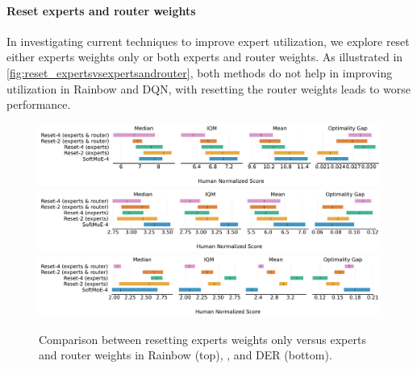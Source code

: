 \paragraph{Reset experts and router weights} In investigating current techniques to improve expert utilization, we explore reset either experts weights only or both experts and router weights. As illustrated in \autoref{fig:reset_expertsvsexpertsandrouter}, both methods do not help in improving utilization in Rainbow and DQN, with resetting the router weights leads to worse performance.

\begin{figure}[h!]
    \centering
    \includegraphics[width=\textwidth]{figures/results/SoftMoE-4_Rainbow-Reset-expertsVSexpertsandrouter_IntEstimates.pdf}
            \includegraphics[width=\textwidth]{figures/results/SoftMoE-4_DQN_Reset_weights_only_vs_weightandrouter_IntEstimates.pdf}
        \includegraphics[width=\textwidth]{figures/results/SoftMoE-4_DER-Reset-expertsVSexpertsandrouter_IntEstimates.pdf}
    \caption{Comparison between resetting experts weights only versus experts and router weights in Rainbow (top), , and DER (bottom). }
    \label{fig:reset_expertsvsexpertsandrouter}
\end{figure}

\newpage
\section{}
\label{sec:appendixExtraEnvs}


